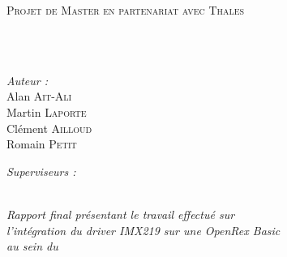 \documentclass[
11pt, %
french, %
singlespacing, %
headsepline, %
]{MastersDoctoralThesis} %
\author{Alan \textsc{Ait-Ali}, Martin \textsc{Laporte}, \\
Clément \textsc{Ailloud} \& Romain \textsc{Petit} \\ } %
\begin{document}
\frontmatter %

\pagestyle{plain} %


\begin{titlepage}
\begin{center}

\vspace*{.06\textheight}
{\scshape\LARGE \univname\par}\vspace{1.5cm} %
\textsc{\Large Projet de Master en partenariat avec Thales}\\[0.5cm] %

\HRule \\[0.4cm] %
{\huge \bfseries \ttitle\par}\vspace{0.4cm} %
\HRule \\[1.5cm] %
 
\begin{minipage}[t]{0.4\textwidth}
\begin{flushleft} \large
\emph{Auteur :}\\
Alan \textsc{Ait-Ali} \\
Martin \textsc{Laporte} \\
Clément \textsc{Ailloud} \\
Romain \textsc{Petit}
\end{flushleft}
\end{minipage}
\begin{minipage}[t]{0.4\textwidth}
\begin{flushright} \large
\emph{Superviseurs :} \\
\supname %
\end{flushright}
\end{minipage}\\[3cm]

\large \textit{Rapport final présentant le travail effectué sur \\
				l'intégration du driver IMX219 sur une OpenRex Basic}\\[0.3cm] %
\textit{au sein du}\\[0.4cm]
\deptname\\[2cm] %


\end{center}
\end{titlepage}
\end{document}
